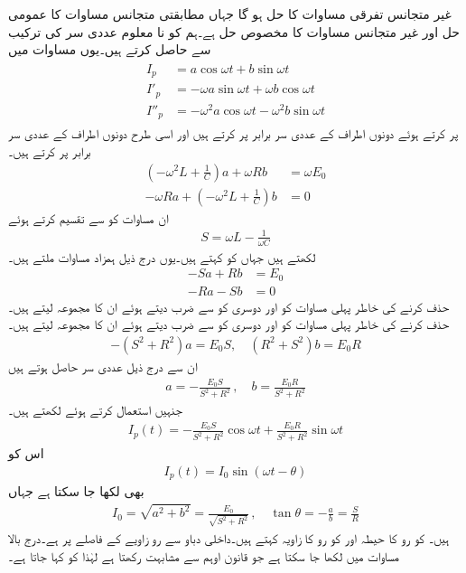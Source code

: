 غیر متجانس تفرقی مساوات  کا حل  ہو گا جہاں  مطابقتی متجانس مساوات کا عمومی حل اور  غیر متجانس مساوات کا مخصوص حل ہے۔ہم  کو نا معلوم عددی سر کی ترکیب سے حاصل کرتے ہیں۔یوں مساوات  میں
\begin{gather}
\begin{aligned}
I_p&=a\cos \omega t+b\sin \omega t\\
I'_p&=-\omega a\sin \omega t+\omega b\cos \omega t\\
I''_p&=-\omega^2 a\cos \omega t-\omega^2 b\sin \omega t
\end{aligned}
\end{gather}
پر کرتے ہوئے دونوں اطراف  کے عددی سر برابر پر کرتے ہیں اور اسی طرح دونوں اطراف   کے عددی سر برابر پر کرتے ہیں۔
\begin{align*}
\left(-\omega^2 L+\frac{1}{C}\right)a+\omega R b&=\omega E_0\\
-\omega R a+\left(-\omega^2 L+\frac{1}{C}\right)b&=0
\end{align*}
ان مساوات کو  سے تقسیم کرتے ہوئے 
\begin{align}
S=\omega L-\tfrac{1}{\omega C}
\end{align}
 لکھتے ہیں جہاں  کو  کہتے ہیں۔یوں درج ذیل ہمزاد مساوات ملتے ہیں۔
\begin{align*}
-S a+R b&=E_0\\
-R a-S b&=0
\end{align*}
 حذف کرنے کی خاطر پہلی مساوات کو  اور دوسری کو  سے ضرب دیتے ہوئے ان کا مجموعہ لیتے ہیں۔ حذف کرنے کی خاطر پہلی مساوات کو  اور دوسری کو  سے ضرب دیتے ہوئے ان کا مجموعہ لیتے ہیں۔
\begin{align}
-(S^2+R^2)a=E_0S,\quad (R^2+S^2)b=E_0 R
\end{align}
ان سے درج ذیل عددی سر حاصل ہوتے ہیں
 \begin{align}
a=-\frac{E_0S}{S^2+R^2}\, ,\quad b=\frac{E_0 R}{S^2+R^2}
\end{align}
جنہیں استعمال کرتے ہوئے  لکھتے ہیں۔
\begin{align}
I_p(t)=-\frac{E_0S}{S^2+R^2}\cos \omega t+\frac{E_0 R}{S^2+R^2} \sin \omega t
\end{align}
اس کو 
\begin{align}
I_p(t)=I_0\sin(\omega t-\theta)
\end{align}
بھی لکھا جا سکتا ہے جہاں
\begin{align}
I_0=\sqrt{a^2+b^2}=\frac{E_0}{\sqrt{S^2+R^2}}\, , \quad \tan \theta=-\frac{a}{b}=\frac{S}{R}
\end{align}
ہیں۔ کو رو کا حیطہ اور  کو رو کا زاویہ کہتے ہیں۔داخلی دباو سے رو  زاویے کے فاصلے پر ہے۔درج بالا مساوات میں  لکھا جا سکتا ہے  جو قانون اوہم سے مشابہت رکھتا ہے لہٰذا  کو  کہا جاتا ہے۔

